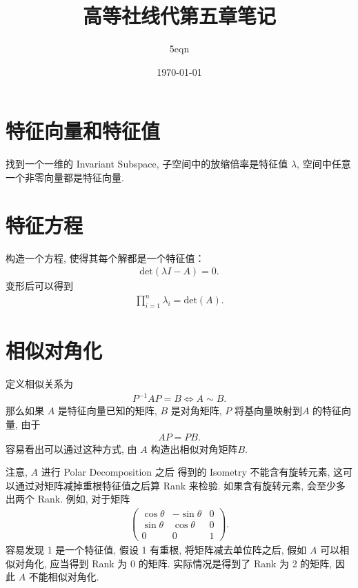 \documentclass[UTF8,a4paper,11pt]{ctexart}
\title{高等社线代第五章笔记}
\author{5eqn}
\date{\today}
\begin{document}
  \maketitle
  \section{特征向量和特征值}
    找到一个一维的 Invariant Subspace,
    子空间中的放缩倍率是特征值 $\lambda$,
    空间中任意一个非零向量都是特征向量. 
  \section{特征方程}
    构造一个方程, 使得其每个解都是一个特征值：
    \[
    \begin{aligned}
      \mathrm{det}(\lambda I-A)=0
    .\end{aligned}
    \] 
    变形后可以得到
    \[
    \begin{aligned}
      \prod_{i=1}^{n} \lambda_i=\mathrm{det}(A)
    .\end{aligned}
    \] 
  \section{相似对角化}
    定义相似关系为
    \[
    \begin{aligned}
      P^{-1}AP=B \iff A \sim B
    .\end{aligned}
    \] 
    那么如果 $A$ 是特征向量已知的矩阵, 
    $B$ 是对角矩阵, 
    $P$ 将基向量映射到$A$ 的特征向量, 
    由于
    \[
    \begin{aligned}
      AP=PB
    .\end{aligned}
    \] 
    容易看出可以通过这种方式, 
    由 $A$ 构造出相似对角矩阵$B$.

    注意, $A$ 进行 Polar Decomposition 之后
    得到的 Isometry 不能含有旋转元素,
    这可以通过对矩阵减掉重根特征值之后算 Rank 来检验.
    如果含有旋转元素, 会至少多出两个 Rank.
    例如, 对于矩阵
    \[
    \begin{aligned}
      \begin{pmatrix} 
        \cos \theta & -\sin \theta & 0\\
        \sin \theta & \cos \theta & 0 \\
        0 & 0 & 1
      \end{pmatrix} 
    .\end{aligned}
    \] 
    容易发现 1 是一个特征值,
    假设 1 有重根,
    将矩阵减去单位阵之后, 
    假如 $A$ 可以相似对角化,
    应当得到 Rank 为 0 的矩阵.
    实际情况是得到了 Rank 为 2 的矩阵,
    因此 $A$ 不能相似对角化.
\end{document}
